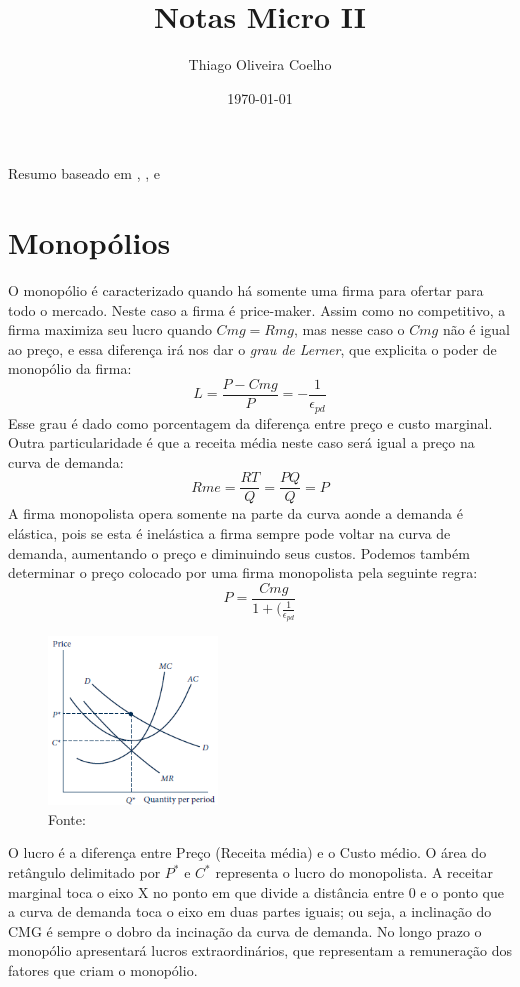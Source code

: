 \documentclass[12pt,a4paper,oneside,brazil]{abntex2}
\title{Notas Micro II}
\author{Thiago Oliveira Coelho}
\date{\today}
\begin{document}
\pagestyle{headings}
\maketitle
\begin{center}
Resumo baseado em \cite{mas}, \cite{nicholson}, \cite{varian} e \cite{pindyck}
\end{center}
\tableofcontents

\chapter{Monopólios}
O monopólio é caracterizado quando há somente uma firma para ofertar para todo o mercado. Neste caso a firma é price-maker. Assim como no competitivo, a firma maximiza seu lucro quando $Cmg = Rmg$, mas nesse caso o $Cmg$ não é igual ao preço, e essa diferença irá nos dar o \emph{grau de Lerner}, que explicita o poder de monopólio da firma:
\[ L = \frac{P - Cmg}{P} = -\frac{1}{\epsilon_{pd}}\]
Esse grau é dado como porcentagem da diferença entre preço e custo marginal. \newline
Outra particularidade é que a receita média neste caso será igual a preço na curva de demanda:
\[ Rme = \frac{RT}{Q} = \frac{P Q}{Q} = P \]
A firma monopolista opera somente na parte da curva aonde a demanda é elástica, pois se esta é inelástica a firma sempre pode voltar na curva de demanda, aumentando o preço e diminuindo seus custos. Podemos também determinar o preço colocado por uma firma monopolista pela seguinte regra:
\[ P = \frac{Cmg}{1 + (\frac{1}{\epsilon_{pd}}}\]

\begin{figure}
	\includegraphics[width=0.4\textwidth]{Monopoly.png}
	\centering
	\caption{Fonte: \cite{nicholson}}
\end{figure}
O lucro é a diferença entre Preço (Receita média) e o Custo médio. O área do retângulo delimitado por $P^*$ e  $C^*$ representa o lucro do monopolista. A receitar marginal toca o eixo X no ponto em que divide a distância entre 0 e o ponto que a curva de demanda toca o eixo em duas partes iguais; ou seja, a inclinação do CMG é sempre o dobro da incinação da curva de demanda. No longo prazo o monopólio apresentará lucros extraordinários, que representam a remuneração dos fatores que criam o monopólio.
\clearpage
\end{document}

